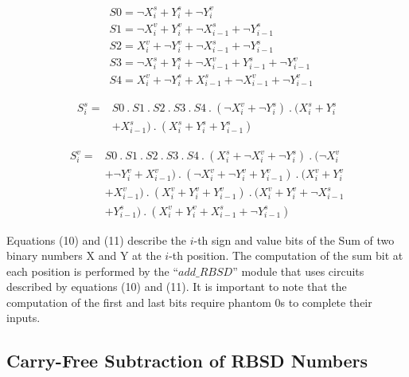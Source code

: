 \documentclass[conference]{IEEEtran}
\begin{document}
\vspace{-1em}
\begin{align}
&S0 = \neg X_{i}^{s} + Y_{i}^{s} + \neg Y_{i}^{v}\\
&S1 = \neg X_{i}^{v} + Y_{i}^{v} + \neg X_{i-1}^{s} + \neg Y_{i-1}^{s}\\
&S2 = X_{i}^{v} + \neg Y_{i}^{v} + \neg X_{i-1}^{s} + \neg Y_{i-1}^{s}\\
&S3 = \neg X_{i}^{s} + Y_{i}^{s} + \neg X_{i-1}^{v} + Y_{i-1}^{s} + \neg Y_{i-1}^{v}\\
&S4 = X_{i}^{v} + \neg Y_{i}^{s} + X_{i-1}^{s} + \neg X_{i-1}^{v} + \neg Y_{i-1}^{v}
\end{align}

\vspace{-1em}
\begin{equation}
\begin{aligned}
S_{i}^s ={} &S0 \ . \ S1 \ . \ S2 \ . \ S3 \ . \ S4 \ . \ (\neg X_{i}^{v} + \neg Y_{i}^{s}) \ . \ (X_{i}^{s} + Y_{i}^{s} \\
&+ X_{i-1}^{s}) \ . \ (X_{i}^{s} + Y_{i}^{s} + Y_{i-1}^{s})
\end{aligned}
\end{equation}

\vspace{-1em}
\begin{equation}
\begin{aligned}
S_{i}^v ={} &S0 \ . \ S1 \ . \ S2 \ . \ S3 \ . \ S4 \ . \ (X_{i}^{s} + \neg X_{i}^{v} + \neg Y_{i}^{s}) \ . \ (\neg X_{i}^{v} \\
&+ \neg Y_{i}^{v} + X_{i-1}^{v}) \ . \ (\neg X_{i}^{v} + \neg Y_{i}^{v} + Y_{i-1}^{v}) \ . \ (X_{i}^{v} + Y_{i}^{v} \\
&+ X_{i-1}^{v}) \ . \ (X_{i}^{v} + Y_{i}^{v} + Y_{i-1}^{v}) \ . \ (X_{i}^{v} + Y_{i}^{v} + \neg X_{i-1}^{s} \\
&+ Y_{i-1}^{s}) \ . \ (X_{i}^{v} + Y_{i}^{v} + X_{i-1}^{s} + \neg Y_{i-1}^{s})
\end{aligned}
\end{equation}

Equations (10) and (11) describe the $i$-th sign and value bits of the Sum of two binary numbers X and Y at the $i$-th position. The computation of the sum bit at each position is performed by the ``$add\_RBSD$'' module that uses circuits described by equations (10) and (11). It is important to note that the computation of the first and last bits require phantom 0s to complete their inputs.

\subsection{Carry-Free Subtraction of RBSD Numbers}
\end{document}
